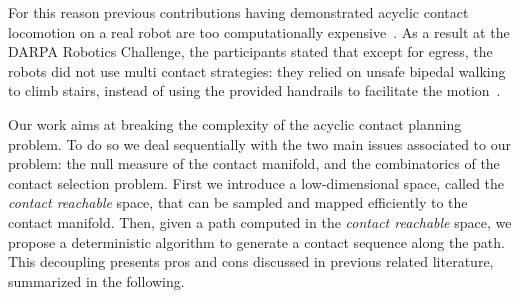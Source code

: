 For this reason previous contributions having demonstrated acyclic contact locomotion on a real robot are too computationally expensive~\citep{Bretl:2006:MPM:1124573.1124585}. As a result at the DARPA Robotics Challenge, the participants stated that except for egress, the robots did not use multi contact strategies: they relied on unsafe bipedal walking to climb stairs, instead of using the provided handrails to facilitate the motion~\citep{atkensondarpa}. 

 Our work aims at breaking the complexity of the acyclic contact planning problem.  To do so we deal sequentially with the two main issues associated to our problem: the null measure of the contact manifold, and the combinatorics of the contact selection problem. First we introduce a low-dimensional space, called the \textit{contact reachable} space, that can be sampled and mapped efficiently to the contact manifold. Then, given a path computed in the \textit{contact reachable} space, we propose a deterministic algorithm to generate a contact sequence along the path.
This decoupling presents pros and cons discussed in previous related literature, summarized in the following.



